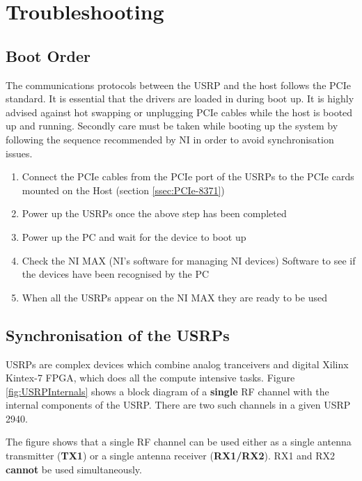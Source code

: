 \chapter{Troubleshooting}\label{ch:troubleshooting}
\section{Boot Order} \label{sec:BootOrder}
The communications protocols between the USRP and the host follows the PCIe standard. It is essential that the drivers are loaded in during boot up. It is highly advised against hot swapping or unplugging PCIe cables while the host is booted up and running. Secondly care must be taken while booting up the system by following the sequence recommended by NI in order to avoid synchronisation issues.

\begin{enumerate}
    \item Connect the PCIe cables from the PCIe port of the USRPs to the PCIe cards mounted on the Host (section \ref{ssec:PCIe-8371})
    \item Power up the USRPs once the above step has been completed
    \item Power up the PC and wait for the device to boot up
    \item Check the NI MAX (NI's software for managing NI devices) Software to see if the devices have been recognised by the PC
    \item When all the USRPs appear on the NI MAX they are ready to be used
\end{enumerate}

\section{Synchronisation of the USRPs} \label{sec:USRPSync}

USRPs are complex devices which combine analog tranceivers and digital Xilinx Kintex-7 FPGA, which does all the compute intensive tasks. Figure \ref{fig:USRPInternals} shows a block diagram of a \textbf{single} RF channel with the internal components of the USRP. There are two such channels in a given USRP 2940.

The figure shows that a single RF channel can be used either as a single antenna transmitter (\textbf{TX1}) or a single antenna receiver (\textbf{RX1/RX2}). RX1 and RX2 \textbf{cannot} be used simultaneously.

